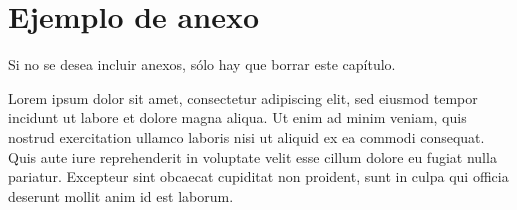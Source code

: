 \chapter{Ejemplo de anexo}
Si no se desea incluir anexos, sólo hay que borrar este capítulo.
\par
Lorem ipsum dolor sit amet, consectetur adipiscing elit, sed eiusmod tempor
incidunt ut labore et dolore magna aliqua. Ut enim ad minim veniam, quis nostrud exercitation ullamco laboris nisi ut aliquid ex ea commodi consequat. Quis aute iure reprehenderit in voluptate velit esse cillum dolore eu fugiat nulla pariatur. Excepteur sint obcaecat cupiditat non proident, sunt in culpa qui officia deserunt mollit anim id est laborum.\\